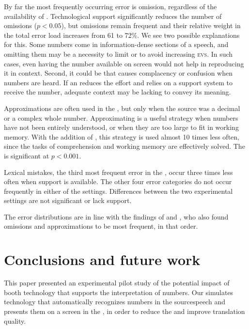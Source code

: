 \documentclass[output=paper]{langsci/langscibook}
\begin{document}
By far the most frequently occurring error is omission, regardless of the availability of . Technological support significantly reduces the number of omissions ($p < 0.05$), but omissions remain frequent and their relative weight in the total error load increases from 61 to 72\%. We see two possible explanations for this. Some numbers come in information-dense sections of a speech, and omitting them may be a necessity to limit  or to avoid increasing \textsc{evs}. In such cases, even having the number available on screen would not help in reproducing it in context. Second, it could be that  causes complacency or confusion when numbers are heard. If an  reduces the  effort and relies on a support system to receive the number, adequate context may be lacking to convey its meaning.

Approximations are often used in the , but only when the source  was a decimal or a complex whole number. Approximating is a useful strategy when numbers have not been entirely understood, or when they are too large to fit in working memory. With the addition of , this strategy is used almost 10 times less often, since the tasks of comprehension and working memory are effectively solved. The  is significant at $p < 0.001$.

Lexical mistakes, the third most frequent error in the , occur three times less often when support is available. The other four error categories do not occur frequently in either of the settings. Differences between the two experimental settings are not significant or lack support.

The error distributions are in line with the findings of \citet{Mazza2001} and \citet{Pinochi2009}, who also found omissions and approximations to be most frequent, in that order.

\section{Conclusions and future work}\largerpage[1]

This paper presented an experimental pilot study of the potential impact of booth technology that supports the interpretation of numbers. Our  simulates technology that automatically recognizes numbers in the source\linebreak speech and presents them on a screen in the , in order to reduce the  and improve translation quality. 
\end{document}
